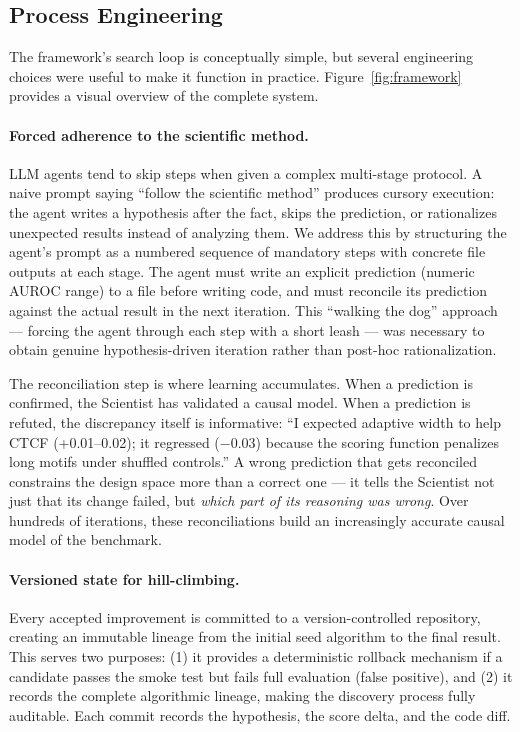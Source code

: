 \documentclass[11pt,a4paper]{article}
\begin{document}
\subsection{Process Engineering}

The framework's search loop is conceptually simple, but several engineering choices were useful to make it function in practice. Figure~\ref{fig:framework} provides a visual overview of the complete system.

\paragraph{Forced adherence to the scientific method.}
LLM agents tend to skip steps when given a complex multi-stage protocol. A naive prompt saying ``follow the scientific method'' produces cursory execution: the agent writes a hypothesis after the fact, skips the prediction, or rationalizes unexpected results instead of analyzing them. We address this by structuring the agent's prompt as a numbered sequence of mandatory steps with concrete file outputs at each stage. The agent must write an explicit prediction (numeric AUROC range) to a file before writing code, and must reconcile its prediction against the actual result in the next iteration. This ``walking the dog'' approach --- forcing the agent through each step with a short leash --- was necessary to obtain genuine hypothesis-driven iteration rather than post-hoc rationalization.

The reconciliation step is where learning accumulates. When a prediction is confirmed, the Scientist has validated a causal model. When a prediction is refuted, the discrepancy itself is informative: ``I expected adaptive width to help CTCF (+0.01--0.02); it regressed ($-$0.03) because the scoring function penalizes long motifs under shuffled controls.'' A wrong prediction that gets reconciled constrains the design space more than a correct one --- it tells the Scientist not just that its change failed, but \emph{which part of its reasoning was wrong}. Over hundreds of iterations, these reconciliations build an increasingly accurate causal model of the benchmark.

\paragraph{Versioned state for hill-climbing.}
Every accepted improvement is committed to a version-controlled repository, creating an immutable lineage from the initial seed algorithm to the final result. This serves two purposes: (1) it provides a deterministic rollback mechanism if a candidate passes the smoke test but fails full evaluation (false positive), and (2) it records the complete algorithmic lineage, making the discovery process fully auditable. Each commit records the hypothesis, the score delta, and the code diff.
\end{document}
